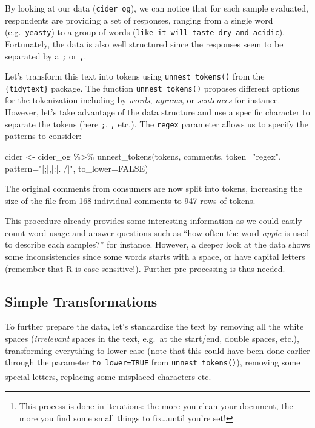 \documentclass[
]{krantz}
\makeatletter
\newenvironment{Shaded}{\begin{snugshade}}{\end{snugshade}}
\newcommand{\AttributeTok}[1]{\textcolor[rgb]{0.61,0.61,0.61}{#1}}
\newcommand{\ConstantTok}[1]{\textcolor[rgb]{0,0,0}{#1}}
\newcommand{\FunctionTok}[1]{\textcolor[rgb]{0,0,0}{#1}}
\newcommand{\NormalTok}[1]{#1}
\newcommand{\OtherTok}[1]{\textcolor[rgb]{0.37,0.37,0.37}{#1}}
\newcommand{\SpecialCharTok}[1]{\textcolor[rgb]{0,0,0}{#1}}
\newcommand{\StringTok}[1]{\textcolor[rgb]{0.5,0.5,0.5}{#1}}
\newenvironment{kframe}{%
\medskip{}
\setlength{\fboxsep}{.8em}
 \def\at@end@of@kframe{}%
 \ifinner\ifhmode%
  \def\at@end@of@kframe{\end{minipage}}%
  \begin{minipage}{\columnwidth}%
 \fi\fi%
 \def\FrameCommand##1{\hskip\@totalleftmargin \hskip-\fboxsep
 \colorbox{shadecolor}{##1}\hskip-\fboxsep
     \hskip-\linewidth \hskip-\@totalleftmargin \hskip\columnwidth}%
 \MakeFramed {\advance\hsize-\width
   \@totalleftmargin\z@ \linewidth\hsize
   \@setminipage}}%
 {\par\unskip\endMakeFramed%
 \at@end@of@kframe}
\renewenvironment{Shaded}{\begin{kframe}}{\end{kframe}}
\makeatother
\begin{document}
By looking at our data (\texttt{cider\_og}), we can notice that for each sample evaluated, respondents are providing a set of responses, ranging from a single word (e.g.~\texttt{yeasty}) to a group of words (\texttt{like\ it\ will\ taste\ dry\ and\ acidic}). Fortunately, the data is also well structured since the responses seem to be separated by a \texttt{;} or \texttt{,}.

Let's transform this text into tokens using \texttt{unnest\_tokens()} from the \texttt{\{tidytext\}} package. The function \texttt{unnest\_tokens()} proposes different options for the tokenization including by \emph{words}, \emph{ngrams}, or \emph{sentences} for instance. However, let's take advantage of the data structure and use a specific character to separate the tokens (here \texttt{;}, \texttt{,} etc.). The \texttt{regex} parameter allows us to specify the patterns to consider:

\begin{Shaded}
\begin{Highlighting}[]
\NormalTok{cider }\OtherTok{\textless{}{-}}\NormalTok{ cider\_og }\SpecialCharTok{\%\textgreater{}\%} 
  \FunctionTok{unnest\_tokens}\NormalTok{(tokens, comments, }\AttributeTok{token=}\StringTok{"regex"}\NormalTok{, }
                \AttributeTok{pattern=}\StringTok{"[;|,|:|.|/]"}\NormalTok{, }\AttributeTok{to\_lower=}\ConstantTok{FALSE}\NormalTok{)}
\end{Highlighting}
\end{Shaded}

The original comments from consumers are now split into tokens, increasing the size of the file from 168 individual comments to 947 rows of tokens.

This procedure already provides some interesting information as we could easily count word usage and answer questions such as ``how often the word \emph{apple} is used to describe each samples?'' for instance. However, a deeper look at the data shows some inconsistencies since some words starts with a space, or have capital letters (remember that R is case-sensitive!). Further pre-processing is thus needed.

\hypertarget{simple-transformations}{%
\subsection{Simple Transformations}\label{simple-transformations}}

To further prepare the data, let's standardize the text by removing all the white spaces (\emph{irrelevant} spaces in the text, e.g.~at the start/end, double spaces, etc.), transforming everything to lower case (note that this could have been done earlier through the parameter \texttt{to\_lower=TRUE} from \texttt{unnest\_tokens()}), removing some special letters, replacing some misplaced characters etc.\footnote{This process is done in iterations: the more you clean your document, the more you find some small things to fix\ldots until you're set!}
\end{document}
